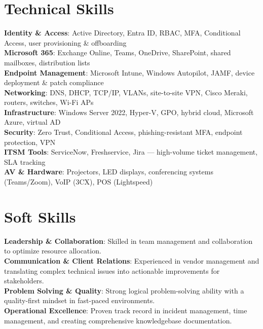 \documentclass[letterpaper,11pt]{article}
\begin{document}
\section{Technical Skills}
 \begin{itemize}[leftmargin=0.15in, label={}]
    \small{\item{
     \textbf{Identity \& Access}{: Active Directory, Entra ID, RBAC, MFA, Conditional Access, user provisioning \& offboarding} \\
     \textbf{Microsoft 365}{: Exchange Online, Teams, OneDrive, SharePoint, shared mailboxes, distribution lists} \\
     \textbf{Endpoint Management}{: Microsoft Intune, Windows Autopilot, JAMF, device deployment \& patch compliance} \\
     \textbf{Networking}{: DNS, DHCP, TCP/IP, VLANs, site-to-site VPN, Cisco Meraki, routers, switches, Wi-Fi APs} \\
     \textbf{Infrastructure}{: Windows Server 2022, Hyper-V, GPO, hybrid cloud, Microsoft Azure, virtual AD} \\
     \textbf{Security}{: Zero Trust, Conditional Access, phishing-resistant MFA, endpoint protection, VPN} \\
     \textbf{ITSM Tools}{: ServiceNow, Freshservice, Jira --- high-volume ticket management, SLA tracking} \\
     \textbf{AV \& Hardware}{: Projectors, LED displays, conferencing systems (Teams/Zoom), VoIP (3CX), POS (Lightspeed)} \\
    }}
 \end{itemize}

\section{Soft Skills}
 \begin{itemize}[leftmargin=0.15in, label={}]
    \small{\item{
     \textbf{Leadership \& Collaboration}{: Skilled in team management and collaboration to optimize resource allocation.} \\
     \textbf{Communication \& Client Relations}{: Experienced in vendor management and translating complex technical issues into actionable improvements for stakeholders.} \\
     \textbf{Problem Solving \& Quality}{: Strong logical problem-solving ability with a quality-first mindset in fast-paced environments.} \\
     \textbf{Operational Excellence}{: Proven track record in incident management, time management, and creating comprehensive knowledgebase documentation.} \\
    }}
 \end{itemize}
\end{document}
